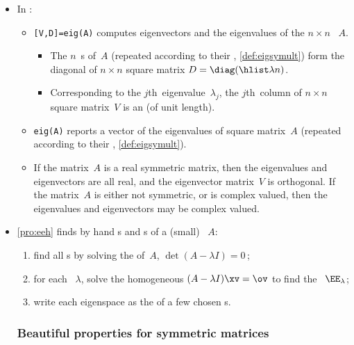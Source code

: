 \begin{itemize}
\item In \script:
\begin{itemize}
\item {}\verb|[V,D]=eig(A)| computes eigenvectors and the eigenvalues of the  \(n\times n\) ~\(A\).
\begin{itemize}
\item The \(n\)~s of~\(A\) (repeated according to their , \autoref{def:eigsymult}) form the diagonal of \(n\times n\) square matrix \(D=\diag(\hlist\lambda n)\).
\item Corresponding to the \(j\)th~eigenvalue~\(\lambda_j\), the \(j\)th~column of \(n\times n\) square matrix~\(V\) is an  (of unit length).
\end{itemize}
\item \verb|eig(A)| reports a vector of the eigenvalues of square matrix~\(A\) (repeated according to their  , \autoref{def:eigsymult}).

\item If the matrix~\(A\) is a real symmetric matrix, then the eigenvalues and eigenvectors are all real, and the eigenvector matrix~\(V\) is orthogonal.
If the matrix~\(A\) is either not symmetric, or is complex valued, then the eigenvalues and eigenvectors may be complex valued.

\end{itemize}


\item \autoref{pro:eeh} finds by hand s and s of a (small) ~\(A\):
\begin{enumerate}
\item find all s by solving the  of~\(A\), \(\det(A-\lambda I)=0\)\,;
\item for each ~\(\lambda\), solve the homogeneous \((A-\lambda I)\xv=\ov\) to find the ~\(\EE_\lambda\);
\item write each eigenspace as the  of a few chosen s.
\end{enumerate}





\subsubsection{Beautiful properties for symmetric matrices}


\end{itemize}

